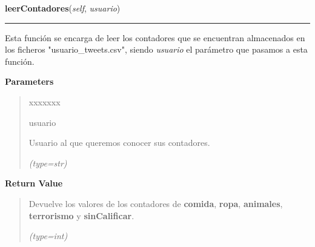     \label{funcionesTwitter:FuncionesTwitter:leerContadores}

    \vspace{0.5ex}

\hspace{.8\funcindent}\begin{boxedminipage}{\funcwidth}

    \raggedright \textbf{leerContadores}(\textit{self}, \textit{usuario})

    \vspace{-1.5ex}

    \rule{\textwidth}{0.5\fboxrule}
\setlength{\parskip}{2ex}
    Esta función se encarga de leer los contadores que se encuentran 
    almacenados en los ficheros "usuario\_tweets.csv", siendo 
    \textit{usuario} el parámetro que pasamos a esta función.

\setlength{\parskip}{1ex}
      \textbf{Parameters}
      \vspace{-1ex}

      \begin{quote}
        \begin{Ventry}{xxxxxxx}

          \item[usuario]

          Usuario al que queremos conocer sus contadores.

            {\it (type=str)}

        \end{Ventry}

      \end{quote}

      \textbf{Return Value}
    \vspace{-1ex}

      \begin{quote}
      Devuelve los valores de los contadores de \textbf{comida}, 
      \textbf{ropa}, \textbf{animales}, \textbf{terrorismo} y 
      \textbf{sinCalificar}.

      {\it (type=int)}

      \end{quote}

    \end{boxedminipage}

    \label{funcionesTwitter:FuncionesTwitter:obtenerTweetsAnimales}

